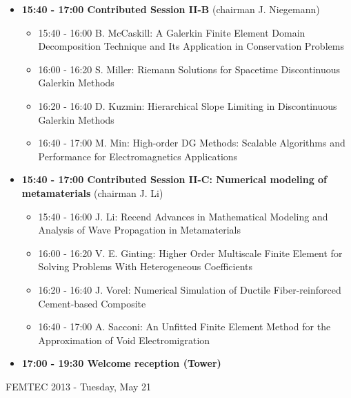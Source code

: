 \documentclass[10pt, A4]{article}%
\begin{document}
\begin{itemize}
\begin{itemize}
  \end{itemize}
  \item {\bf 15:40 - 17:00 Contributed Session II-B} (chairman J. Niegemann) 
  \begin{itemize}
    \item 15:40 - 16:00 {B. McCaskill}: {A Galerkin Finite Element Domain Decomposition Technique and Its Application in Conservation Problems}
    \item 16:00 - 16:20 {S. Miller}: {Riemann Solutions for Spacetime Discontinuous Galerkin Methods}
    \item 16:20 - 16:40 {D. Kuzmin}: {Hierarchical Slope Limiting in Discontinuous Galerkin Methods}
    \item 16:40 - 17:00 {M. Min}: {High-order DG Methods: Scalable Algorithms and Performance for Electromagnetics Applications}
  \end{itemize}
    \item {\bf 15:40 - 17:00 Contributed Session II-C: Numerical modeling of metamaterials} (chairman J. Li) 
  \begin{itemize}
    \item 15:40 - 16:00 {J. Li}: {Recend Advances in Mathematical Modeling and Analysis of Wave Propagation in Metamaterials} %
    \item 16:00 - 16:20 {V. E. Ginting}: {Higher Order Multiscale Finite Element for Solving Problems With Heterogeneous Coefficients}
    \item 16:20 - 16:40 {J. Vorel}: {Numerical Simulation of Ductile Fiber-reinforced Cement-based Composite}
    \item 16:40 - 17:00 {A. Sacconi}: {An Unfitted Finite Element Method for the Approximation of Void Electromigration}
  \end{itemize}    
  \item {\bf 17:00 - 19:30 Welcome reception (Tower)} 
\end{itemize}

\newpage

\centerline{\huge FEMTEC 2013 - Tuesday, May 21}
\vspace{4mm}
\end{document}
